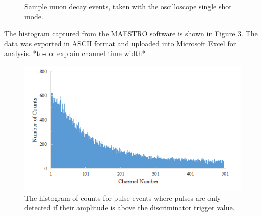 \documentclass[%
 aip,
 amsmath,amssymb,
 reprint,%
floatfix,
]{revtex4-1}
\begin{document}
\begin{figure}[H]
	\centering
	\hfill
	\hfill
	\caption{Sample muon decay events, taken with the oscilloscope single shot mode.}
\end{figure}

The histogram captured from the MAESTRO software is shown in Figure 3. The data was exported in ASCII format and uploaded into Microsoft Excel for analysis. *to-do: explain channel time width*


\begin{figure}[H]
	\centering
	\includegraphics[scale=0.8]{unfiltered.png}
	\caption{The histogram of counts for pulse events where pulses are only detected if their amplitude is above the discriminator trigger value.}
\end{figure}
\end{document}
